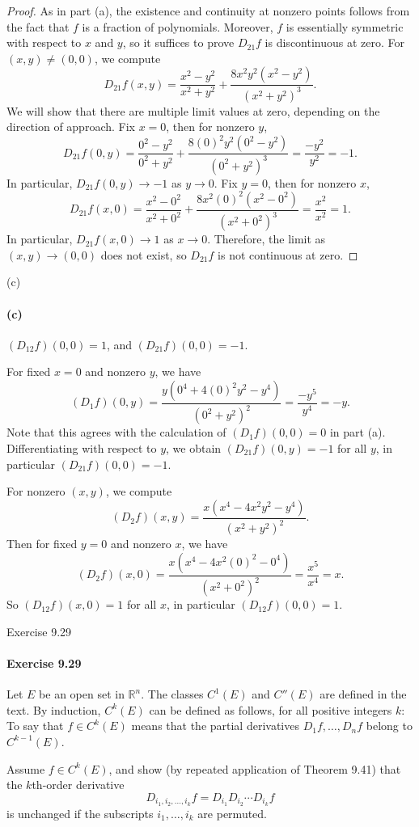 \documentclass[12pt]{article}
\newenvironment{fullbox}{\begin{lrbox}{\savefullbox}\begin{minipage}{\dimexpr\textwidth-2\fboxsep\relax}}{\end{minipage}\end{lrbox}\begin{center}\framebox[\textwidth]{\usebox{\savefullbox}}\end{center}}
\newenvironment{pbox}[1][]{\begin{fullbox}\ifx#1\empty\else\paragraph{#1}\fi}{\end{fullbox}}
\theoremstyle{definition}
\newcommand{\R}{\mathbb{R}}
\begin{document}
\begin{proof}
    As in part (a), the existence and continuity at nonzero points follows from the fact that $f$ is a fraction of polynomials. Moreover, $f$ is essentially symmetric with respect to $x$ and $y$, so it suffices to prove $D_{21}f$ is discontinuous at zero. For $(x, y) \ne (0, 0)$, we compute
    \[
        D_{21}f(x, y) = \frac{x^2 - y^2}{x^2 + y^2} + \frac{8x^2y^2(x^2 - y^2)}{(x^2 + y^2)^3}.
    \]
    We will show that there are multiple limit values at zero, depending on the direction of approach. Fix $x = 0$, then for nonzero $y$,
    \[
        D_{21}f(0, y)
            = \frac{0^2 - y^2}{0^2 + y^2} + \frac{8(0)^2y^2(0^2 - y^2)}{(0^2 + y^2)^3}
            = \frac{-y^2}{y^2}
            = -1.
    \]
    In particular, $D_{21}f(0, y) \to -1$ as $y \to 0$. Fix $y = 0$, then for nonzero $x$,
    \[
        D_{21}f(x, 0)
            = \frac{x^2 - 0^2}{x^2 + 0^2} + \frac{8x^2(0)^2(x^2 - 0^2)}{(x^2 + 0^2)^3}
            = \frac{x^2}{x^2}
            = 1.
    \]
    In particular, $D_{21}f(x, 0) \to 1$ as $x \to 0$. Therefore, the limit as $(x, y) \to (0, 0)$ does not exist, so $D_{21}f$ is not continuous at zero.

\end{proof}

\begin{pbox}[(c)]
    $(D_{12}f)(0, 0) = 1$, and $(D_{21}f)(0, 0) = -1$.
\end{pbox}

For fixed $x = 0$ and nonzero $y$, we have
\[
    (D_1f)(0, y)
        = \frac{y(0^4 + 4(0)^2y^2 - y^4)}{(0^2 + y^2)^2}
        = \frac{-y^5}{y^4}
        = -y.
\]
Note that this agrees with the calculation of $(D_1f)(0, 0) = 0$ in part (a). Differentiating with respect to $y$, we obtain $(D_{21}f)(0, y) = -1$ for all $y$, in particular $(D_{21}f)(0, 0) = -1$.

For nonzero $(x, y)$, we compute
\[
    (D_2f)(x, y) = \frac{x(x^4 - 4x^2y^2 - y^4)}{(x^2 + y^2)^2}.
\]
Then for fixed $y = 0$ and nonzero $x$, we have
\[
    (D_2f)(x, 0)
        = \frac{x(x^4 - 4x^2(0)^2 - 0^4)}{(x^2 + 0^2)^2}
        = \frac{x^5}{x^4}
        = x.
\]
So $(D_{12}f)(x, 0) = 1$ for all $x$, in particular $(D_{12}f)(0, 0) = 1$.



\newpage
\begin{pbox}[Exercise 9.29]
    Let $E$ be an open set in $\R^n$. The classes $C^1(E)$ and $C''(E)$ are defined in the text. By induction, $C^k(E)$ can be defined as follows, for all positive integers $k$: To say that $f \in C^k(E)$ means that the partial derivatives $D_1f, \dots, D_nf$ belong to $C^{k-1}(E)$.

    Assume $f \in C^k(E)$, and show (by repeated application of Theorem 9.41) that the $k$th-order derivative
    \[
        D_{i_1, i_2, \dots, i_k} f = D_{i_1}D_{i_2} \cdots D_{i_k} f
    \]
    is unchanged if the subscripts $i_1, \dots, i_k$ are permuted.
\end{pbox}
\end{document}
